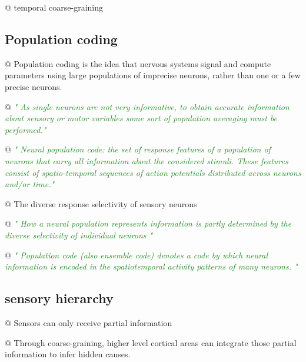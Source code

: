 \documentclass[utf8]{article}
\newenvironment{ants}
			{
			 \begin{easylist}[itemize]
			}
			{
			\end{easylist}
			}
\newcommand{\rewrite}[1]{\textcolor{ForestGreen}{\textit{"#1"}}\newline}
\begin{document}
			\begin{ants}
				
				@ temporal coarse-graining
				
			\end{ants}
		
		
		
		\subsection{Population coding}
			\begin{ants}
				@ Population coding is the idea that nervous systems signal and compute parameters using large populations of imprecise neurons, rather than one or a few precise neurons. 
				
				@ \rewrite{
					As single neurons are not very informative, to obtain accurate information about sensory or motor variables some sort of population averaging must be performed.}
																					
			
				@ \rewrite{
					Neural population code: the set of response features of a population of neurons that carry all information about the considered stimuli. These features consist of spatio-temporal sequences of action potentials distributed across neurons and/or time.}
				
				@ The diverse response selectivity of sensory neurons
				
				@ \rewrite{
					How a neural population represents information is partly determined by the diverse selectivity of individual neurons \cite{Shamir2014}}
				
				@ \rewrite{
					Population code (also ensemble code) denotes a code by which neural information is encoded in the spatiotemporal activity patterns of many neurons.
					} \cite{binder2009encyclopedia}
				
			\end{ants}
			
			
		
		
		\subsection{sensory hierarchy}
		
			\begin{ants}
				@ Sensors can only receive partial information
				
				@ Through coarse-graining, higher level cortical areas can integrate those partial information to infer hidden causes. 
		
			\end{ants}
		
\end{document}

